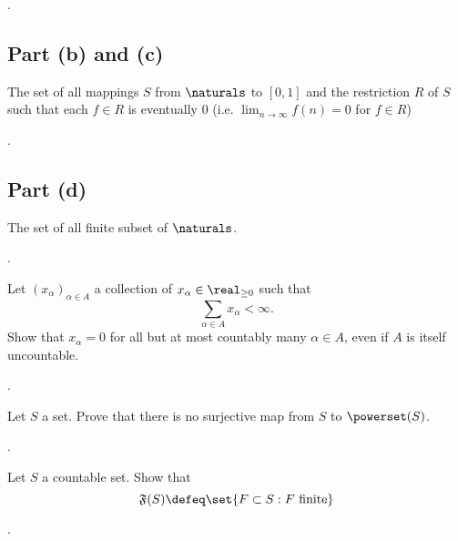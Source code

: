 \documentclass{article}
\begin{document}
\begin{solution}
    [Redacted].
\end{solution}

\subsection{Part (b) and (c)}
The set of all mappings $S$ from $\naturals$ to $[0,1]$ and the restriction $R$ of $S$ such that each $f\in R$ is eventually $0$ (i.e. $\lim_{n\to\infty} f(n)=0$ for $f\in R$)

\begin{solution}
    [Redacted].
\end{solution}

\subsection{Part (d)}
The set of all finite subset of $\naturals$.

\begin{solution}
    [Redacted].
\end{solution}

\problemsec

Let $(x_\alpha)_{\alpha\in A}$ a collection of $x_\alpha \in \real_{\ge 0}$ such that
\[
    \sum_{\alpha\in A} x_\alpha <\infty.
\]
Show that $x_\alpha=0$ for all but at most countably many $\alpha \in A$, even if $A$ is itself uncountable.

\begin{solution}
    [Redacted].
\end{solution}

\problemsec
Let $S$ a set.
Prove that there is no surjective map from $S$ to $\powerset(S)$.

\begin{solution}
    [Redacted].
\end{solution}

\problemsec

Let $S$ a countable set.
Show that
\[
    \mathfrak{F}(S)\defeq \set{F\subset S: F \text{ finite}}
\]

\begin{solution}
    [Redacted].
\end{solution}
\end{document}
